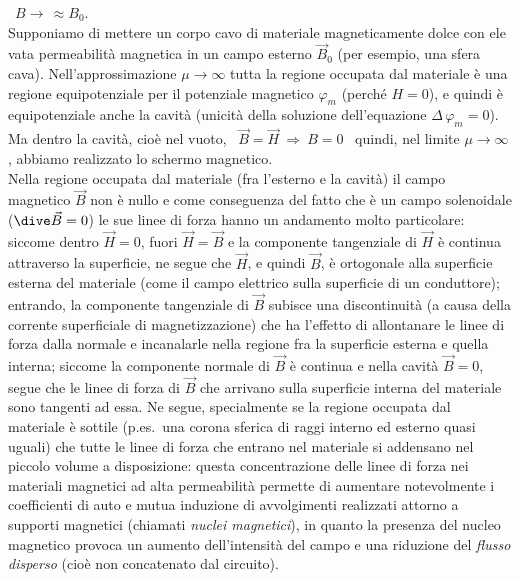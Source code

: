 \ $B\to\,\approx B_0$.\\
Supponiamo di mettere un corpo cavo di materiale magneticamente dolce con ele\-
vata permeabilit\`a magnetica in un campo esterno $\vec B_0$ (per esempio, una
sfera cava). Nell'approssimazione $\mu\to\infty$ tutta la regione occupata dal
materiale \`e una regione equipotenziale per il potenziale magnetico $\varphi_m$
(perch\'e $H=0$), e quindi \`e equipotenziale anche la cavit\`a (unicit\`a della
soluzione dell'equazione $\Delta\,\varphi_m=0$). Ma dentro la cavit\`a, cio\`e
nel vuoto, \ $\vec B=\vec H\ \Rightarrow\ B=0$ \ quindi, nel limite
$\mu\to\infty$, abbiamo realizzato lo schermo magnetico.\\
Nella regione occupata dal materiale (fra l'esterno e la cavit\`a) il campo
magnetico $\vec B$ non \`e nullo e come conseguenza del fatto che \`e un campo
solenoidale ($\dive\vec B=0$) le sue linee di forza hanno un andamento molto
particolare: siccome dentro $\vec H=0$, fuori $\vec H=\vec B$ e la componente
tangenziale di $\vec H$ \`e continua attraverso la superficie, ne segue che
$\vec H$, e quindi $\vec B$, \`e ortogonale alla superficie esterna del
materiale (come il campo elettrico sulla superficie di un conduttore); entrando,
la componente tangenziale di $\vec B$ subisce una discontinuit\`a (a causa della
corrente superficiale di magnetizzazione) che ha l'effetto di allontanare le
linee di forza dalla normale e incanalarle nella regione fra la superficie
esterna e quella interna; siccome la componente normale di $\vec B$ \`e continua
e nella cavit\`a $\vec B=0$, segue che le linee di forza di $\vec B$ che
arrivano sulla superficie interna del materiale sono tangenti ad essa. Ne segue,
specialmente se la regione occupata dal materiale \`e sottile (p.es.\ una corona
sferica di raggi interno ed esterno quasi uguali) che tutte le linee di forza
che entrano nel materiale si addensano nel piccolo volume a disposizione: questa
concentrazione delle linee di forza nei materiali magnetici ad alta
permeabilit\`a permette di aumentare notevolmente i coefficienti di auto e mutua
induzione di avvolgimenti realizzati attorno a supporti magnetici (chiamati
\textit{nuclei magnetici}), in quanto la presenza del nucleo magnetico provoca
un aumento dell'intensit\`a del campo e una riduzione del \textit{flusso
disperso} (cio\`e non concatenato dal circuito).

